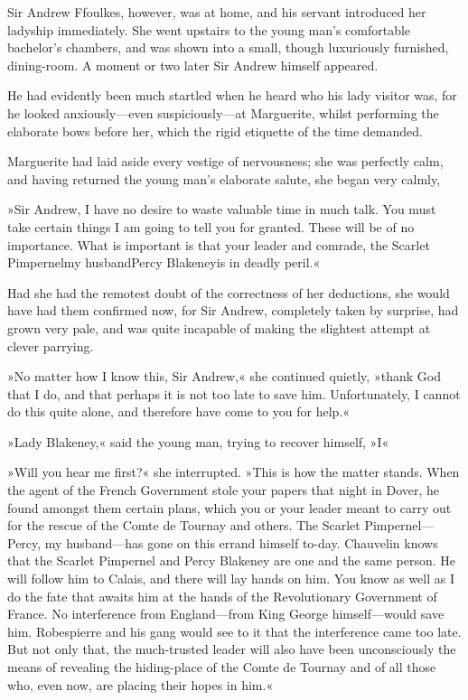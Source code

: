 Sir Andrew Ffoulkes, however, was at home, and his servant introduced her ladyship immediately. She went upstairs to the young man's comfortable bachelor's chambers, and was shown into a small, though luxuriously furnished, dining-room. A moment or two later Sir Andrew himself appeared.

He had evidently been much startled when he heard who his lady visitor was, for he looked anxiously—even suspiciously—at Marguerite, whilst performing the elaborate bows before her, which the rigid etiquette of the time demanded.

Marguerite had laid aside every vestige of nervousness; she was perfectly calm, and having returned the young man's elaborate salute, she began very calmly,\longdash


»Sir Andrew, I have no desire to waste valuable time in much talk. You must take certain things I am going to tell you for granted. These will be of no importance. What is important is that your leader and comrade, the Scarlet Pimpernel\textellipsis \allowbreak  my husband\textellipsis \allowbreak  Percy Blakeney\textellipsis \allowbreak  is in deadly peril.«

Had she had the remotest doubt of the correctness of her deductions, she would have had them confirmed now, for Sir Andrew, completely taken by surprise, had grown very pale, and was quite incapable of making the slightest attempt at clever parrying.

»No matter how I know this, Sir Andrew,« she continued quietly, »thank God that I do, and that perhaps it is not too late to save him. Unfortunately, I cannot do this quite alone, and therefore have come to you for help.«

»Lady Blakeney,« said the young man, trying to recover himself, »I\textellipsis«

»Will you hear me first?« she interrupted. »This is how the matter stands. When the agent of the French Government stole your papers that night in Dover, he found amongst them certain plans, which you or your leader meant to carry out for the rescue of the Comte de Tournay and others. The Scarlet Pimpernel—Percy, my husband—has gone on this errand himself to-day. Chauvelin knows that the Scarlet Pimpernel and Percy Blakeney are one and the same person. He will follow him to Calais, and there will lay hands on him. You know as well as I do the fate that awaits him at the hands of the Revolutionary Government of France. No interference from England—from King George himself—would save him. Robespierre and his gang would see to it that the interference came too late. But not only that, the much-trusted leader will also have been unconsciously the means of revealing the hiding-place of the Comte de Tournay and of all those who, even now, are placing their hopes in him.«


